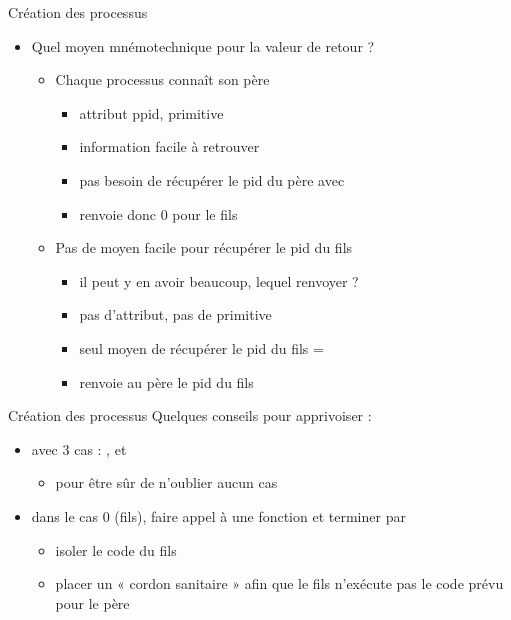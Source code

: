 \begin {frame} {Création des processus}
    \begin {itemize}
	\item Quel moyen mnémotechnique pour la valeur de retour ?
	    \begin {itemize}
		\item Chaque processus connaît son père
		    \begin {itemize}
			\item attribut ppid, primitive 
			\item information facile à retrouver
			\item \implique pas besoin de récupérer
			    le pid du père avec 
			\item {} renvoie donc 0 pour le fils
		    \end {itemize}

		\item Pas de moyen facile pour récupérer le pid du fils
		    \begin {itemize}
			\item il peut y en avoir beaucoup, lequel renvoyer ?
			\item pas d'attribut, pas de primitive
			\item \implique seul moyen de récupérer le pid du
			    fils = 
			\item {} renvoie au père le pid du fils
		    \end {itemize}
	    \end {itemize}
    \end {itemize}
\end {frame}

\begin {frame} {Création des processus}
    Quelques conseils pour apprivoiser  :

    \begin {itemize}
	\item {} avec 3 cas : ,  et

	    \begin {itemize}
		\item pour être sûr de n'oublier aucun cas
	    \end {itemize}
	\item dans le cas 0 (fils), faire appel à une fonction 
	    et terminer par 
	    \begin {itemize}
		\item isoler le code du fils
		\item placer un « cordon sanitaire » afin que le fils
		    n'exécute pas le code prévu pour le père
	    \end {itemize}
    \end {itemize}
\end {frame}

